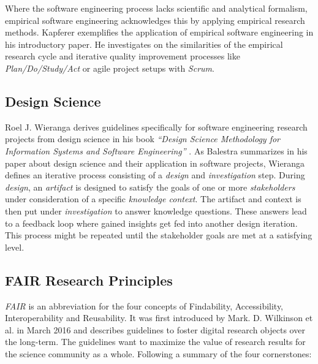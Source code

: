 \documentclass[12pt,a4paper]{article}
\begin{document}
Where the software engineering process lacks scientific and analytical formalism, empirical software engineering acknowledges this by applying empirical research methods. Kapferer \cite{kapferer:2019:empirical} exemplifies the application of empirical software engineering in his introductory paper. He investigates on the similarities of the empirical research cycle and iterative quality improvement processes like \emph{Plan/Do/Study/Act} \cite{deming} or agile project setups with \emph{Scrum}.

\subsection{Design Science}

Roel J. Wieranga derives guidelines specifically for software engineering research projects from design science in his book \emph{``Design Science Methodology for Information Systems and Software Engineering''} \cite{wieringa}. As Balestra \cite{balestra:2019:designscience:articactandcontext} summarizes in his paper about design science and their application in software projects, Wieranga \cite{wieringa} defines an iterative process consisting of a \emph{design} and \emph{investigation} step. During \emph{design}, an \emph{artifact} is designed to satisfy the goals of one or more \emph{stakeholders} under consideration of a specific \emph{knowledge context}. The artifact and context is then put under \emph{investigation} to answer knowledge questions. These answers lead to a feedback loop where gained insights get fed into another design iteration. This process might be repeated until the stakeholder goals are met at a satisfying level.

\subsection{FAIR Research Principles}
\label{sec:fair}

\emph{FAIR} is an abbreviation for the four concepts of Findability, Accessibility, Interoperability and Reusability. It was first introduced by Mark. D. Wilkinson et al. in March 2016 \cite{wilkinson:2016} and describes guidelines to foster digital research objects over the long-term. The guidelines want to maximize the value of research results for the science community as a whole. Following a summary of the four cornerstones:
\end{document}

